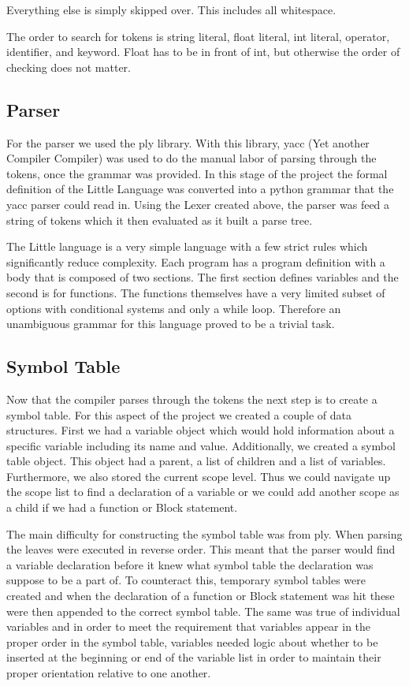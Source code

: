 \documentclass[12pt]{article}
\begin{document}
                Everything else is simply skipped over. This includes all whitespace.

                The order to search for tokens is string literal, float literal, int literal, operator, identifier, and keyword. Float has to be in front of int, but otherwise the order of checking does not matter.




    	\subsection{Parser}
    		For the parser we used the ply library.  With this library, yacc (Yet another Compiler Compiler) was used to do the manual labor of parsing through the tokens, once the grammar was provided.   In this stage of the project the formal definition of the Little Language was converted into a python grammar that the yacc parser could read in.  Using the Lexer created above, the parser was feed a string of tokens which it then evaluated as it built a parse tree.  
    		
    		
    		The Little language is a very simple language with a few strict rules which significantly reduce complexity.  Each program has a program definition with a body that is composed of two sections.  The first section defines variables and the second is for functions.  The functions themselves have a very limited subset of options with conditional systems and only a while loop.  Therefore an unambiguous grammar for this language proved to be a trivial task.  
    		

    	\subsection{Symbol Table}
    		Now that the compiler parses through the tokens the next step is to create a symbol table.  For this aspect of the project we created a couple of data structures.  First we had a variable object which would hold information about a specific variable including its name and value.  Additionally, we created a symbol table object.  This object had a parent, a list of children and a list of variables.  Furthermore, we also stored the current scope level.  Thus we could navigate up the scope list to find a declaration of a variable or we could add another scope as a child if we had a function or Block statement.  
    		
    		The main difficulty for constructing the symbol table was from ply.  When parsing the leaves were executed in reverse order.  This meant that the parser would find a variable declaration before it knew what symbol table the declaration was suppose to be a part of.   To counteract this, temporary symbol tables were created and when the declaration of a function or Block statement was hit these were then appended to the correct symbol table.  The same was true of individual variables and in order to meet the requirement that variables appear in the proper order in the symbol table, variables needed logic about whether to be inserted at the beginning or end of the variable list in order to maintain their proper orientation relative to one another.
\end{document}
